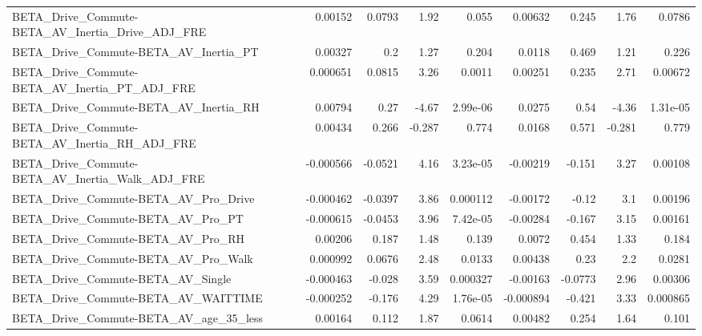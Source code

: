 \begin{tabular}{lrrrrrrrr}
BETA\_Drive\_Commute-BETA\_AV\_Inertia\_Drive\_ADJ\_FRE   &     0.00152 &       0.0793 &     1.92 &    0.055 &    0.00632 &       0.245 &         1.76 &        0.0786 \\
BETA\_Drive\_Commute-BETA\_AV\_Inertia\_PT              &     0.00327 &          0.2 &     1.27 &    0.204 &     0.0118 &       0.469 &         1.21 &         0.226 \\
BETA\_Drive\_Commute-BETA\_AV\_Inertia\_PT\_ADJ\_FRE      &    0.000651 &       0.0815 &     3.26 &   0.0011 &    0.00251 &       0.235 &         2.71 &       0.00672 \\
BETA\_Drive\_Commute-BETA\_AV\_Inertia\_RH              &     0.00794 &         0.27 &    -4.67 & 2.99e-06 &     0.0275 &        0.54 &        -4.36 &      1.31e-05 \\
BETA\_Drive\_Commute-BETA\_AV\_Inertia\_RH\_ADJ\_FRE      &     0.00434 &        0.266 &   -0.287 &    0.774 &     0.0168 &       0.571 &       -0.281 &         0.779 \\
BETA\_Drive\_Commute-BETA\_AV\_Inertia\_Walk\_ADJ\_FRE    &   -0.000566 &      -0.0521 &     4.16 & 3.23e-05 &   -0.00219 &      -0.151 &         3.27 &       0.00108 \\
BETA\_Drive\_Commute-BETA\_AV\_Pro\_Drive               &   -0.000462 &      -0.0397 &     3.86 & 0.000112 &   -0.00172 &       -0.12 &          3.1 &       0.00196 \\
BETA\_Drive\_Commute-BETA\_AV\_Pro\_PT                  &   -0.000615 &      -0.0453 &     3.96 & 7.42e-05 &   -0.00284 &      -0.167 &         3.15 &       0.00161 \\
BETA\_Drive\_Commute-BETA\_AV\_Pro\_RH                  &     0.00206 &        0.187 &     1.48 &    0.139 &     0.0072 &       0.454 &         1.33 &         0.184 \\
BETA\_Drive\_Commute-BETA\_AV\_Pro\_Walk                &    0.000992 &       0.0676 &     2.48 &   0.0133 &    0.00438 &        0.23 &          2.2 &        0.0281 \\
BETA\_Drive\_Commute-BETA\_AV\_Single                  &   -0.000463 &       -0.028 &     3.59 & 0.000327 &   -0.00163 &     -0.0773 &         2.96 &       0.00306 \\
BETA\_Drive\_Commute-BETA\_AV\_WAITTIME                &   -0.000252 &       -0.176 &     4.29 & 1.76e-05 &  -0.000894 &      -0.421 &         3.33 &      0.000865 \\
BETA\_Drive\_Commute-BETA\_AV\_age\_35\_less             &     0.00164 &        0.112 &     1.87 &   0.0614 &    0.00482 &       0.254 &         1.64 &         0.101 \\

\end{tabular}
